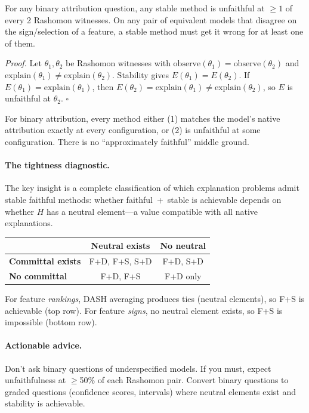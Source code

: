 \documentclass{jmlr}
\begin{document}
\begin{theorem}\label{thm:unfaith-bound}
For any binary attribution question, any stable method is unfaithful at $\geq 1$ of every 2 Rashomon witnesses.
On any pair of equivalent models that disagree on the sign/selection of a feature, a stable method must get it wrong for at least one of them.
\end{theorem}

\noindent\textit{Proof.}
Let $\theta_1, \theta_2$ be Rashomon witnesses with $\text{observe}(\theta_1) = \text{observe}(\theta_2)$ and $\text{explain}(\theta_1) \neq \text{explain}(\theta_2)$.
Stability gives $E(\theta_1) = E(\theta_2)$.
If $E(\theta_1) = \text{explain}(\theta_1)$, then $E(\theta_2) = \text{explain}(\theta_1) \neq \text{explain}(\theta_2)$, so $E$ is unfaithful at $\theta_2$. \hfill$\square$

\begin{theorem}\label{thm:all-or-nothing}
For binary attribution, every method either (1) matches the model's native attribution exactly at every configuration, or (2) is unfaithful at some configuration.
There is no ``approximately faithful'' middle ground.
\end{theorem}

\paragraph{The tightness diagnostic.}
The key insight is a complete classification of which explanation problems admit stable faithful methods:
whether faithful~+~stable is achievable depends on whether $H$ has a neutral element---a value compatible with all native explanations.

\begin{center}
\begin{tabular}{l|cc}
 & Neutral exists & No neutral \\
\hline
\textbf{Committal exists} & F+D, F+S, S+D & F+D, S+D \\
\textbf{No committal}     & F+D, F+S       & F+D only \\
\end{tabular}
\end{center}

\noindent For feature \emph{rankings}, DASH averaging produces ties (neutral elements), so F+S is achievable (top row).
For feature \emph{signs}, no neutral element exists, so F+S is impossible (bottom row).

\paragraph{Actionable advice.}
Don't ask binary questions of underspecified models.
If you must, expect unfaithfulness at $\geq$50\% of each Rashomon pair.
Convert binary questions to graded questions (confidence scores, intervals) where neutral elements exist and stability is achievable.
\end{document}
